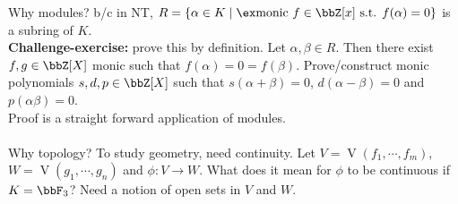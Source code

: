     \noindent Why modules? b/c in NT, $R = \{\alpha \in K \mid \ex \text{monic }f \in \bbZ[x] \text{ s.t. } f(\alpha) = 0\}$ is a subring of $K$. \\
    \textbf{Challenge-exercise:} prove this by definition. Let $\alpha,\beta \in R$. Then there exist $f,g \in \bbZ[X]$ monic such that $f(\alpha) = 0 = f(\beta)$. Prove/construct monic polynomials $s,d,p \in \bbZ[X]$ such that $s(\alpha + \beta) = 0$, $d(\alpha-\beta) = 0$ and $p(\alpha \beta) = 0$. \\
    Proof is a straight forward application of modules. \\ 
    \\
    \noindent Why topology? To study geometry, need continuity. Let $V = \operatorname{V}(f_1,\cdots,f_m)$, $W = \operatorname{V}(g_1,\cdots,g_n)$ and $\phi: V \to W$. What does it mean for $\phi$ to be continuous if $K = \bbF_3$? Need a notion of open sets in $V$ and $W$.

